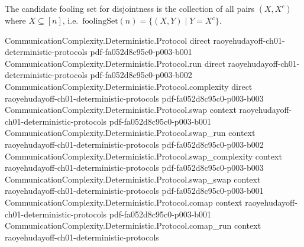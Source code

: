 \begin{definition}
\label{CommunicationComplexity.Functions.Disjointness.foolingSet}
\leanok
The candidate fooling set for disjointness is the collection of all pairs
$(X, X^c)$ where $X \subseteq [n]$, i.e.\ $\mathrm{foolingSet}(n) = \{(X, Y) \mid Y = X^c\}$.
\end{definition}

\begin{theorem}
\label{CommunicationComplexity.Functions.Disjointness.foolingSet_isFoolingSet}
\leanok
{}
\proofstep
  {CommunicationComplexity.Deterministic.Protocol}
  {direct}
  {raoyehudayoff-ch01-deterministic-protocols}
  {pdf-fa052d8c95c0-p003-b001}
\proofstep
  {CommunicationComplexity.Deterministic.Protocol.run}
  {direct}
  {raoyehudayoff-ch01-deterministic-protocols}
  {pdf-fa052d8c95c0-p003-b002}
\proofstep
  {CommunicationComplexity.Deterministic.Protocol.complexity}
  {direct}
  {raoyehudayoff-ch01-deterministic-protocols}
  {pdf-fa052d8c95c0-p003-b003}
\proofstep
  {CommunicationComplexity.Deterministic.Protocol.swap}
  {context}
  {raoyehudayoff-ch01-deterministic-protocols}
  {pdf-fa052d8c95c0-p003-b001}
\proofstep
  {CommunicationComplexity.Deterministic.Protocol.swap_run}
  {context}
  {raoyehudayoff-ch01-deterministic-protocols}
  {pdf-fa052d8c95c0-p003-b002}
\proofstep
  {CommunicationComplexity.Deterministic.Protocol.swap_complexity}
  {context}
  {raoyehudayoff-ch01-deterministic-protocols}
  {pdf-fa052d8c95c0-p003-b003}
\proofstep
  {CommunicationComplexity.Deterministic.Protocol.swap_swap}
  {context}
  {raoyehudayoff-ch01-deterministic-protocols}
  {pdf-fa052d8c95c0-p003-b001}
\proofstep
  {CommunicationComplexity.Deterministic.Protocol.comap}
  {context}
  {raoyehudayoff-ch01-deterministic-protocols}
  {pdf-fa052d8c95c0-p003-b001}
\proofstep
  {CommunicationComplexity.Deterministic.Protocol.comap_run}
  {context}
  {raoyehudayoff-ch01-deterministic-protocols}

\end{theorem}
